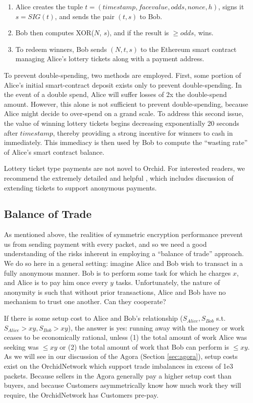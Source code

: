 \documentclass{article}
\newcommand{\orchid}{Orchid}
\newcommand{\Orchid}{\orchid}
\begin{document}
\begin{enumerate}
\item Alice creates the tuple $t = (timestamp, face value, odds, nonce, h)$, signs it $s = SIG(t)$, and sends the pair $(t, s)$ to Bob.
\item Bob then computes XOR($N$, $s$), and if the result is $\geq odds$, wins.
\item To redeem winners, Bob sends $(N, t, s)$ to the Ethereum smart contract managing Alice's lottery tickets along with a payment address.
\end{enumerate}

To prevent double-spending, two methods are employed. First, some portion of Alice's initial smart-contract deposit exists only to prevent double-spending. In the event of a double spend, Alice will suffer losses of 2x the double-spend amount. However, this alone is not sufficient to prevent double-spending, because Alice might decide to over-spend on a grand scale. To address this second issue, the value of winning lottery tickets begins decreasing exponentially 20 seconds after $timestamp$, thereby providing a strong incentive for winners to cash in immediately. This immediacy is then used by Bob to compute the ``wasting rate'' of Alice's smart contract balance.

Lottery ticket type payments are not novel to \Orchid. For interested readers, we recommend the extremely detailed and helpful , which includes discussion of extending tickets to support anonymous payments.

\subsection{Balance of Trade}
\label{tokens-bot}

As mentioned above, the realities of symmetric encryption performance prevent us from sending payment with every packet, and so we need a good understanding of the risks inherent in employing a ``balance of trade'' approach. We do so here in a general setting: imagine Alice and Bob wish to transact in a fully anonymous manner. Bob is to perform some task for which he charges $x$, and Alice is to pay him once every $y$ tasks. Unfortunately, the nature of anonymity is such that without prior transactions, Alice and Bob have no mechanism to trust one another. Can they cooperate?

If there is some setup cost to Alice and Bob's relationship ($S_{Alice}, S_{Bob}$ s.t. $S_{Alice} > xy, S_{Bob} > xy$), the answer is yes: running away with the money or work ceases to be economically rational, unless (1) the total amount of work Alice was seeking was $\leq xy$ or (2) the total amount of work that Bob can perform is $\leq xy$. As we will see in our discussion of the Agora (Section \ref{sec:agora}), setup costs exist on the \Orchid Network which support trade imbalances in excess of 1e3 packets. Because sellers in the Agora generally pay a higher setup cost than buyers, and because Customers asymmetrically know how much work they will require, the \Orchid Network has Customers pre-pay.
\end{document}

